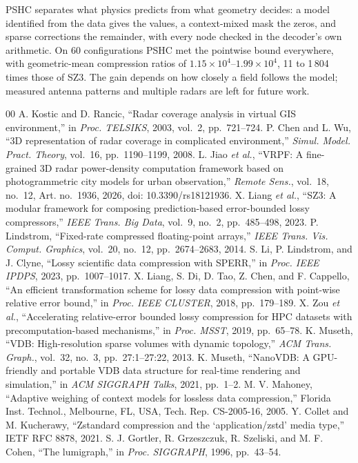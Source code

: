 \documentclass[conference]{IEEEtran}
\begin{document}
PSHC separates what physics predicts from what geometry decides: a model identified from the data gives the values, a context-mixed mask the zeros, and sparse corrections the remainder, with every node checked in the decoder's own arithmetic. On 60 configurations PSHC met the pointwise bound everywhere, with geometric-mean compression ratios of $1.15\times10^4$--$1.99\times10^4$, 11 to 1\,804 times those of SZ3. The gain depends on how closely a field follows the model; measured antenna patterns and multiple radars are left for future work.

\begin{thebibliography}{00}
 A. Kostic and D. Rancic, ``Radar coverage analysis in virtual GIS environment,'' in \textit{Proc. TELSIKS}, 2003, vol.~2, pp.~721--724.
 P. Chen and L. Wu, ``3D representation of radar coverage in complicated environment,'' \textit{Simul. Model. Pract. Theory}, vol.~16, pp.~1190--1199, 2008.
 L. Jiao \textit{et al.}, ``VRPF: A fine-grained 3D radar power-density computation framework based on photogrammetric city models for urban observation,'' \textit{Remote Sens.}, vol.~18, no.~12, Art. no.~1936, 2026, doi: 10.3390/rs18121936.
 X. Liang \textit{et al.}, ``SZ3: A modular framework for composing prediction-based error-bounded lossy compressors,'' \textit{IEEE Trans. Big Data}, vol.~9, no.~2, pp.~485--498, 2023.
 P. Lindstrom, ``Fixed-rate compressed floating-point arrays,'' \textit{IEEE Trans. Vis. Comput. Graphics}, vol.~20, no.~12, pp.~2674--2683, 2014.
 S. Li, P. Lindstrom, and J. Clyne, ``Lossy scientific data compression with SPERR,'' in \textit{Proc. IEEE IPDPS}, 2023, pp.~1007--1017.
 X. Liang, S. Di, D. Tao, Z. Chen, and F. Cappello, ``An efficient transformation scheme for lossy data compression with point-wise relative error bound,'' in \textit{Proc. IEEE CLUSTER}, 2018, pp.~179--189.
 X. Zou \textit{et al.}, ``Accelerating relative-error bounded lossy compression for HPC datasets with precomputation-based mechanisms,'' in \textit{Proc. MSST}, 2019, pp.~65--78.
 K. Museth, ``VDB: High-resolution sparse volumes with dynamic topology,'' \textit{ACM Trans. Graph.}, vol.~32, no.~3, pp.~27:1--27:22, 2013.
 K. Museth, ``NanoVDB: A GPU-friendly and portable VDB data structure for real-time rendering and simulation,'' in \textit{ACM SIGGRAPH Talks}, 2021, pp.~1--2.
 M. V. Mahoney, ``Adaptive weighing of context models for lossless data compression,'' Florida Inst. Technol., Melbourne, FL, USA, Tech. Rep. CS-2005-16, 2005.
 Y. Collet and M. Kucherawy, ``Zstandard compression and the `application/zstd' media type,'' IETF RFC 8878, 2021.
 S. J. Gortler, R. Grzeszczuk, R. Szeliski, and M. F. Cohen, ``The lumigraph,'' in \textit{Proc. SIGGRAPH}, 1996, pp.~43--54.
\end{thebibliography}
\end{document}
